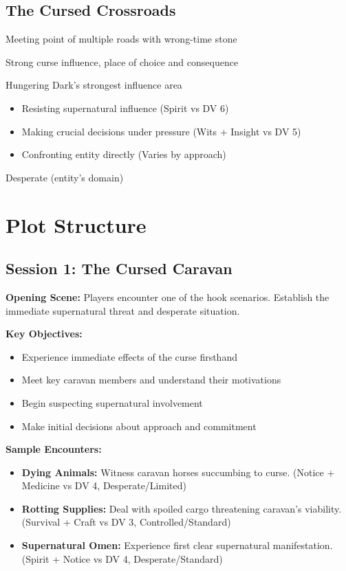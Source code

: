 \documentclass[11pt]{article}
\newenvironment{location}[1]{\begin{description}[leftmargin=*,style=standard]\item[\textbf{#1}]}{\end{description}}
\begin{document}
\subsection{The Cursed Crossroads}
\begin{location}{The Cursed Crossroads}
\item[Description:] Meeting point of multiple roads with wrong-time stone
\item[Features:] Strong curse influence, place of choice and consequence
\item[Significance:] Hungering Dark's strongest influence area
\item[Challenges:] 
  \begin{itemize}
    \item Resisting supernatural influence (Spirit vs DV 6)
    \item Making crucial decisions under pressure (Wits + Insight vs DV 5)
    \item Confronting entity directly (Varies by approach)
  \end{itemize}
\item[Position:] Desperate (entity's domain)
\end{location}

\section{Plot Structure}

\subsection{Session 1: The Cursed Caravan}

\textbf{Opening Scene:} Players encounter one of the hook scenarios. Establish the immediate supernatural threat and desperate situation.

\textbf{Key Objectives:}
\begin{itemize}
\item Experience immediate effects of the curse firsthand
\item Meet key caravan members and understand their motivations
\item Begin suspecting supernatural involvement
\item Make initial decisions about approach and commitment
\end{itemize}

\textbf{Sample Encounters:}
\begin{itemize}
\item \textbf{Dying Animals:} Witness caravan horses succumbing to curse. (Notice + Medicine vs DV 4, Desperate/Limited)
\item \textbf{Rotting Supplies:} Deal with spoiled cargo threatening caravan's viability. (Survival + Craft vs DV 3, Controlled/Standard)
\item \textbf{Supernatural Omen:} Experience first clear supernatural manifestation. (Spirit + Notice vs DV 4, Desperate/Standard)
\end{itemize}
\end{document}
